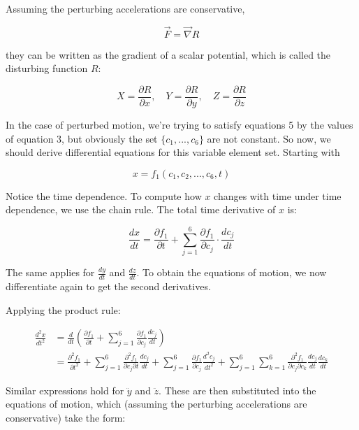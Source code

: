 \documentclass{article}
\begin{document}
Assuming the perturbing accelerations are conservative, 

\begin{equation}
    \vec{F} = \vec{\nabla} R
\end{equation}

they can be written as the gradient of a scalar potential, which is called the disturbing function \( R \):

\[
X = \frac{\partial R}{\partial x}, \quad
Y = \frac{\partial R}{\partial y}, \quad
Z = \frac{\partial R}{\partial z}
\]

In the case of perturbed motion, we're trying to satisfy equations 5 by the values of equation 3, but obviously the set $\{c_1, ..., c_6\}$ are not constant. So now, we should derive differential equations for this variable element set. Starting with

\begin{equation}
    x = f_1(c_1, c_2, ..., c_6, t)
\end{equation}

Notice the time dependence. To compute how $x$ changes with time under time dependence, we use the chain rule. The total time derivative of \( x \) is:

\begin{equation}
    \frac{dx}{dt} = \frac{\partial f_1}{\partial t} + \sum_{j=1}^{6} \frac{\partial f_1}{\partial c_j} \cdot \frac{dc_j}{dt}
\end{equation}

The same applies for \( \frac{dy}{dt} \) and \( \frac{dz}{dt} \). To obtain the equations of motion, we now differentiate again to get the second derivatives.

Applying the product rule:

\begin{align*}
\frac{d^2x}{dt^2}
&= \frac{d}{dt}\left( \frac{\partial f_1}{\partial t} + \sum_{j=1}^{6} \frac{\partial f_1}{\partial c_j} \frac{dc_j}{dt} \right) \\
&= \frac{\partial^2 f_1}{\partial t^2}
+ \sum_{j=1}^{6} \frac{\partial^2 f_1}{\partial c_j \partial t} \frac{dc_j}{dt}
+ \sum_{j=1}^{6} \frac{\partial f_1}{\partial c_j} \frac{d^2c_j}{dt^2}
+ \sum_{j=1}^{6} \sum_{k=1}^{6} \frac{\partial^2 f_1}{\partial c_j \partial c_k} \frac{dc_j}{dt} \frac{dc_k}{dt}
\end{align*}

Similar expressions hold for \( \ddot{y} \) and \( \ddot{z} \). These are then substituted into the equations of motion, which (assuming the perturbing accelerations are conservative) take the form:
\end{document}
